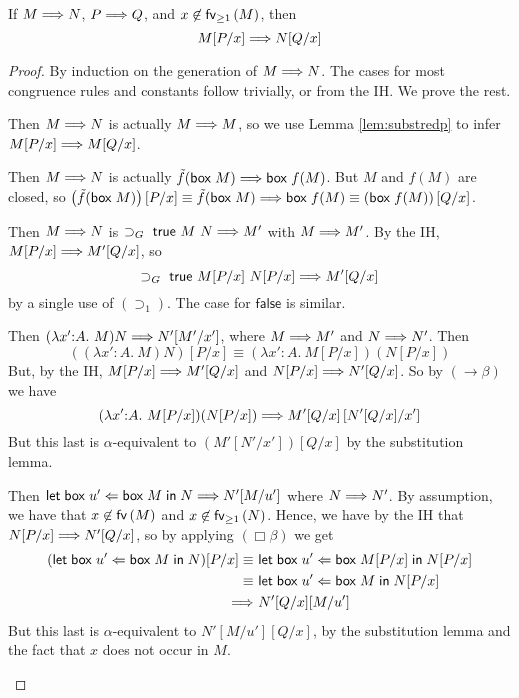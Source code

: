 \begin{lem} 
  \label{lem:redp}
  If $M \mathrel{\Longrightarrow} N$, $P \mathrel{\Longrightarrow} Q$, and $x \not\in \mathsf{fv}_{\geq 1}\left(M\right)$, then \[
    M[P/x] \mathrel{\Longrightarrow} N[Q/x]
  \]
\end{lem}

\begin{proof}
  By induction on the generation of $M \mathrel{\Longrightarrow} N$. The cases for
  most congruence rules and constants follow trivially, or from
  the IH. We prove the rest.
  \begin{indproof}
      Then $M \mathrel{\Longrightarrow} N$ is actually $M \mathrel{\Longrightarrow} M$, so we use Lemma
      \ref{lem:substredp} to infer $M[P/x] \mathrel{\Longrightarrow} M[Q/x]$. 

      Then $M \mathrel{\Longrightarrow} N$ is actually $\tilde f(\mathsf{box\;}M) \mathrel{\Longrightarrow}
      \mathsf{box\;}f(M)$. But $M$ and $f(M)$ are closed, so
      $\left(\tilde f(\mathsf{box\;}M)\right)[P/x] \equiv \tilde
      f(\mathsf{box\;}M) \mathrel{\Longrightarrow} \mathsf{box\;}f(M) \equiv
      \left(\mathsf{box\;}f(M)\right)[Q/x]$.

      Then $M \mathrel{\Longrightarrow} N$ is $\supset_G\ \textsf{true}\ M\ N \mathrel{\Longrightarrow}
      M'$ with $M \mathrel{\Longrightarrow} M'$. By the IH, $M[P/x] \mathrel{\Longrightarrow} M'[Q/x]$, so
      \[
	\supset_G\ \textsf{true}\ M[P/x]\ N[P/x]
	  \mathrel{\Longrightarrow}
	M'[Q/x]
      \] by a single use of $(\supset_1)$. The case for
      $\textsf{false}$ is similar.

    \indcase{$\rightarrow \beta$}
      Then $(\lambda x'{:}A.\ M)N \mathrel{\Longrightarrow} N'[M'/x']$, where $M \mathrel{\Longrightarrow}
      M'$ and $N \mathrel{\Longrightarrow} N'$. Then \[
	\left((\lambda x'{:}A.\ M)N\right)[P/x]
	  \equiv
	(\lambda x'{:}A.\ M[P/x])(N[P/x])
      \] But, by the IH, $M[P/x] \mathrel{\Longrightarrow} M'[Q/x]$ and $N[P/x] \mathrel{\Longrightarrow}
      N'[Q/x]$. So by $(\rightarrow \beta)$ we have \[
        (\lambda x'{:}A.\ M[P/x])(N[P/x])
          \mathrel{\Longrightarrow}
        M'[Q/x]\left[N'[Q/x]/x'\right]
      \] But this last is $\alpha$-equivalent to
      $\left(M'[N'/x']\right)\left[Q/x\right]$ by the substitution
      lemma.

    \indcase{$\Box\beta$}
      Then $\mathsf{let\;box\;} u' \Leftarrow \mathsf{box\;}M \mathsf{\;in\;} N \mathrel{\Longrightarrow} N'[M/u']$ where $N
      \mathrel{\Longrightarrow} N'$. By assumption, we have that $x \not\in \mathsf{fv}\left(M\right)$
      and $x \not\in \mathsf{fv}_{\geq 1}\left(N\right)$. Hence, we have by the IH that
      $N[P/x] \mathrel{\Longrightarrow} N'[Q/x]$, so by applying $(\Box\beta)$ we get
      \begin{align*}
	(\mathsf{let\;box\;} u' \Leftarrow \mathsf{box\;}M \mathsf{\;in\;} N)[P/x]
	  \equiv\
	    &\mathsf{let\;box\;} u' \Leftarrow \mathsf{box\;}M[P/x] \mathsf{\;in\;} N[P/x] \\
	  \equiv\
	    &\mathsf{let\;box\;} u' \Leftarrow \mathsf{box\;}M \mathsf{\;in\;} N[P/x] \\
	  \mathrel{\Longrightarrow}\
	    &N'[Q/x][M/u']
      \end{align*} But this last is $\alpha$-equivalent to
      $N'[M/u'][Q/x]$, by the substitution lemma and the fact that
      $x$ does not occur in $M$.


\end{indproof}
\end{proof}
